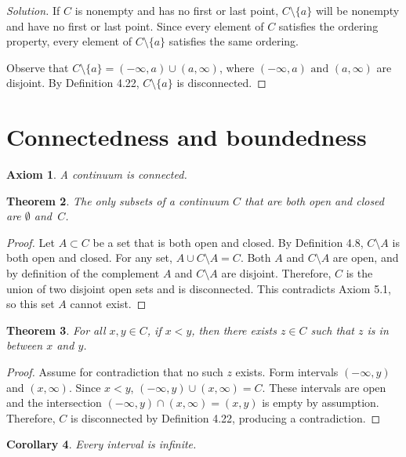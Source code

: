 \documentclass{amsart}
\newtheorem{theorem}{Theorem}
\newtheorem{axiom}[theorem]{Axiom}
\newtheorem{corollary}[theorem]{Corollary}
\newcommand{\1}{\mathds{1}}
\numberwithin{equation}{section}
\numberwithin{theorem}{section}
\begin{document}
\begin{proof}[Solution]
	If $C$ is nonempty and has no first or last point, $C\setminus \{a\}$ will be nonempty and have no first or last point. Since every element of $C$ satisfies the ordering property, every element of $C\setminus \{a\}$ satisfies the same ordering. 
	
	Observe that $C\setminus \{a\} = (-\infty, a) \cup (a,\infty)$, where $(-\infty, a) \text { and } (a,\infty)$ are disjoint. By Definition 4.22, $C\setminus \{a\}$ is disconnected. 
\end{proof}

\section{Connectedness and boundedness}


\begin{axiom}
A continuum is connected.
\end{axiom}

\begin{theorem}
The only subsets of a continuum $C$ that are both open and closed are $\emptyset$ and~$C$.
\end{theorem}

\begin{proof}
	Let $A\subset C$ be a set that is both open and closed. By Definition 4.8, $C\setminus A$ is both open and closed. For any set, $A\cup C\setminus A = C$. Both $A$ and $C\setminus A$ are open, and by definition of the complement $A$ and  $C\setminus A$ are disjoint. Therefore, $C$ is the union of two disjoint open sets and is disconnected. This contradicts Axiom 5.1, so this set $A$ cannot exist. 
\end{proof}

\begin{theorem}
For all $x, y \in C$, if $x < y$, then there exists $z \in C$ such that $z$ is in between $x$ and $y$.
\end{theorem}

\begin{proof}
	Assume for contradiction that no such $z$ exists. Form intervals $(-\infty, y)$ and $(x,\infty)$. Since $x < y$, $(-\infty, y)\cup(x,\infty)=C$. These intervals are open and the intersection $(-\infty, y)\cap(x,\infty)= (x,y)$ is empty by assumption. Therefore, $C$ is disconnected by Definition 4.22, producing a contradiction. 
\end{proof}

\begin{corollary}
Every interval is infinite.
\end{corollary}
\end{document}
